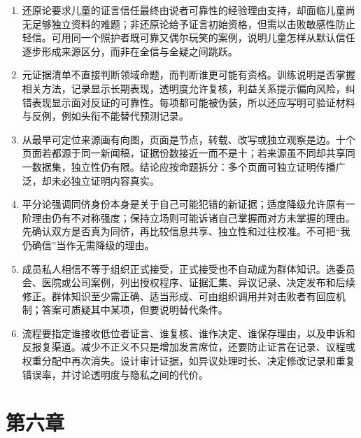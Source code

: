 \begin{enumerate}
\item 还原论要求儿童的证言信任最终由说者可靠性的经验理由支持，却面临儿童尚无足够独立资料的难题；非还原论给予证言初始资格，但需以击败敏感性防止轻信。可用同一个照护者既可靠又偶尔玩笑的案例，说明儿童怎样从默认信任逐步形成来源区分，而非在全信与全疑之间跳跃。
\item 元证据清单不直接判断领域命题，而判断谁更可能有资格。训练说明是否掌握相关方法，记录显示长期表现，透明度允许复核，利益关系提示偏向风险，纠错表现显示面对反证的可靠性。每项都可能被伪装，所以还应写明可验证材料与反例，例如头衔不能替代预测记录。
\item 从最早可定位来源画有向图，页面是节点，转载、改写或独立观察是边。十个页面若都源于同一新闻稿，证据份数接近一而不是十；若来源虽不同却共享同一数据集，独立性仍有限。结论应按命题拆分：多个页面可独立证明传播广泛，却未必独立证明内容真实。
\item 平分论强调同侪身份本身是关于自己可能犯错的新证据；适度降级允许原有一阶理由仍有不对称强度；保持立场则可能诉诸自己掌握而对方未掌握的理由。先确认双方是否真为同侪，再比较信息共享、独立性和过往校准。不可把“我仍确信”当作无需降级的理由。
\item 成员私人相信不等于组织正式接受，正式接受也不自动成为群体知识。选委员会、医院或公司案例，列出授权程序、证据汇集、异议记录、决定发布和后续修正。群体知识至少需正确、适当形成、可由组织调用并对击败者有回应机制；答案可质疑其中某项，但要说明替代条件。
\item 流程要指定谁接收低位者证言、谁复核、谁作决定、谁保存理由，以及申诉和反报复渠道。减少不正义不只是增加发言席位，还要防止证言在记录、议程或权重分配中再次消失。设计审计证据，如异议处理时长、决定修改记录和重复错误率，并讨论透明度与隐私之间的代价。
\end{enumerate}

\section*{第六章}

